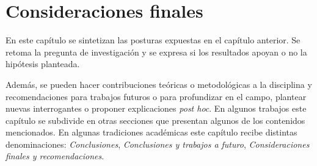 \chapter{Consideraciones finales}

En este capítulo se sintetizan las posturas expuestas en el capítulo anterior. Se retoma la pregunta de investigación y se expresa si los resultados apoyan o no la hipótesis planteada. 

Además, se pueden hacer contribuciones teóricas o metodológicas a la disciplina y recomendaciones para trabajos futuros o para profundizar en el campo, plantear nuevas interrogantes o proponer explicaciones \textit{post hoc}. En algunos trabajos este capítulo se subdivide en otras secciones que presentan algunos de los contenidos mencionados. 
En algunas tradiciones académicas este capítulo recibe distintas denominaciones: \textit{Conclusiones}, \textit{Conclusiones y trabajos a futuro}, \textit{Consideraciones finales y recomendaciones}. 

